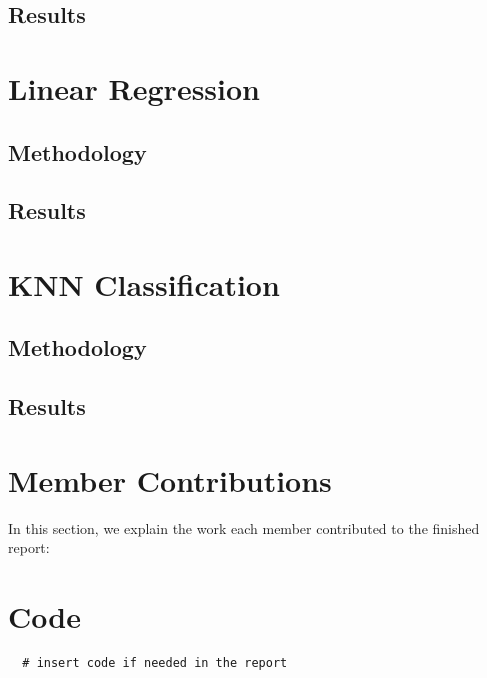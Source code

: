 \documentclass{article}
\begin{document}
\subsection{Results}

\newpage

\section{Linear Regression}

\subsection{Methodology}

\newpage

\subsection{Results}

\section{KNN Classification}

\subsection{Methodology}

\subsection{Results}

\newpage
\section{Member Contributions}
In this section, we explain the work each member contributed to the finished report:\linebreak

\newpage
\appendix
\section{Code}
\begin{verbatim}
  # insert code if needed in the report
  
\end{verbatim}
\end{document}
